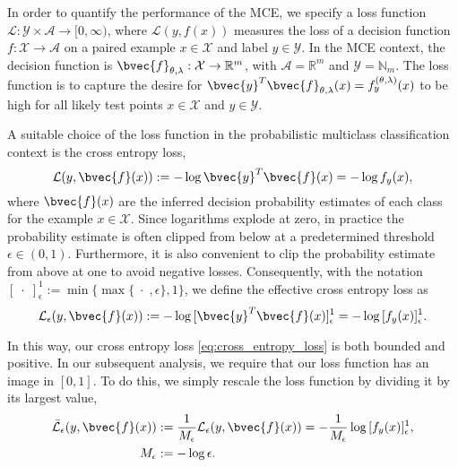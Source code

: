 \documentclass[runningheads, envcountsame, a4paper]{llncs}
\begin{document}
			In order to quantify the performance of the \gls{MCE}, we specify a loss function $\mathcal{L} : \mathcal{Y} \times \mathcal{A} \to [0, \infty)$, where $\mathcal{L}(y, f(x))$ measures the loss of a decision function $f : \mathcal{X} \to \mathcal{A}$ on a paired example $x \in \mathcal{X}$ and label $y \in \mathcal{Y}$. In the \gls{MCE} context, the decision function is $\bvec{f}_{\theta, \lambda} : \mathcal{X} \to \mathbb{R}^{m}$, with $\mathcal{A} = \mathbb{R}^{m}$ and $\mathcal{Y} = \mathbb{N}_{m}$. The loss function is to capture the desire for $\bvec{y}^{T} \bvec{f}_{\theta, \lambda}(x) = f_{y}^{(\theta, \lambda)}(x)$ to be high for all likely test points $x \in \mathcal{X}$ and $y \in \mathcal{Y}$.
			
			A suitable choice of the loss function in the probabilistic multiclass classification context is the cross entropy loss,
			\begin{equation}
				\mathcal{L}(y, \bvec{f}(x)) := - \log{\bvec{y}^{T} \bvec{f}(x)} = - \log{f_{y}(x)},
			\end{equation}
			where $\bvec{f}(x)$ are the inferred decision probability estimates of each class for the example $x \in \mathcal{X}$. Since logarithms explode at zero, in practice the probability estimate is often clipped from below at a predetermined threshold $\epsilon \in (0, 1)$. Furthermore, it is also convenient to clip the probability estimate from above at one to avoid negative losses. Consequently, with the notation $[\;\cdot\;]_{\epsilon}^{1} := \min\{\max\{\;\cdot\;, \epsilon\}, 1\}$, we define the effective cross entropy loss as
			\begin{equation}
				\mathcal{L}_{\epsilon}(y, \bvec{f}(x)) := - \log{ [\bvec{y}^{T} \bvec{f}(x)]_{\epsilon}^{1} } = - \log{ [f_{y}(x)]_{\epsilon}^{1} }.
			\label{eq:cross_entropy_loss}
			\end{equation}
			
			In this way, our cross entropy loss \eqref{eq:cross_entropy_loss} is both bounded and positive. In our subsequent analysis, we require that our loss function has an image in $[0, 1]$. To do this, we simply rescale the loss function by dividing it by its largest value,
			\begin{equation}
			\begin{aligned}
				\bar{\mathcal{L}}_{\epsilon}(y, \bvec{f}(x)) &:= \frac{1}{M_{\epsilon}} \mathcal{L}_{\epsilon}(y, \bvec{f}(x)) = - \frac{1}{M_{\epsilon}} \log{ [f_{y}(x)]_{\epsilon}^{1} }, \\
				M_{\epsilon} &:= - \log{\epsilon}.
			\end{aligned}
			\label{eq:normalized_cross_entropy_loss}
			\end{equation}
			
\end{document}

